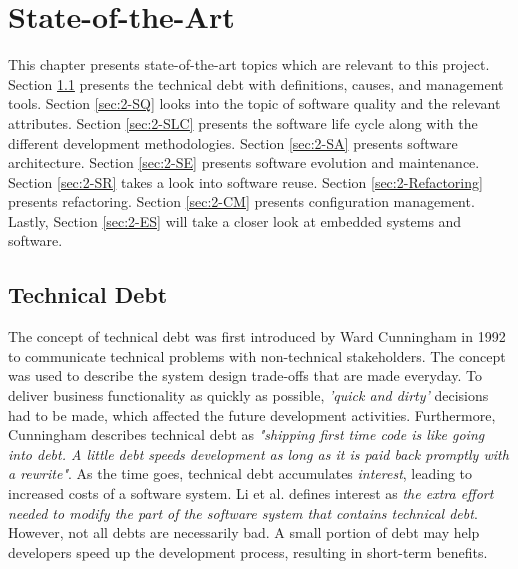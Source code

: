 \chapter{State-of-the-Art}
This chapter presents state-of-the-art topics which are relevant to this project. Section \ref{sec:2-TD} presents the technical debt with definitions, causes, and management tools. Section \ref{sec:2-SQ} looks into the topic of software quality and the relevant attributes. Section \ref{sec:2-SLC} presents the software life cycle along with the different development methodologies. Section \ref{sec:2-SA} presents software architecture. Section \ref{sec:2-SE} presents software evolution and maintenance.
Section \ref{sec:2-SR} takes a look into software reuse. Section \ref{sec:2-Refactoring} presents refactoring. Section \ref{sec:2-CM} presents configuration management. Lastly, Section \ref{sec:2-ES} will take a closer look at embedded systems and software.


\section{Technical Debt}
\label{sec:2-TD}
The concept of technical debt was first introduced by Ward Cunningham in 1992 to communicate technical problems with non-technical stakeholders\cite{p29-cunningham}. The concept was used to describe the system design trade-offs that are made everyday. To deliver business functionality as quickly as possible, \textit{'quick and dirty'} decisions had to be made, which affected the future development activities. Furthermore, Cunningham describes technical debt as \textit{"shipping first time code is like going into debt. A little debt speeds development as long as it is paid back promptly with a rewrite"}. As the time goes, technical debt accumulates \textit{interest}, leading to increased costs of a software system\cite{p31-guo,p35-klinger}. Li et al.\cite{li2015systematic} defines interest as \textit{the extra effort needed to modify the part of the software system that contains technical debt}. However, not all debts are necessarily bad. A small portion of debt may help developers speed up the development process, resulting in short-term benefits\cite{p31-guo}. 

